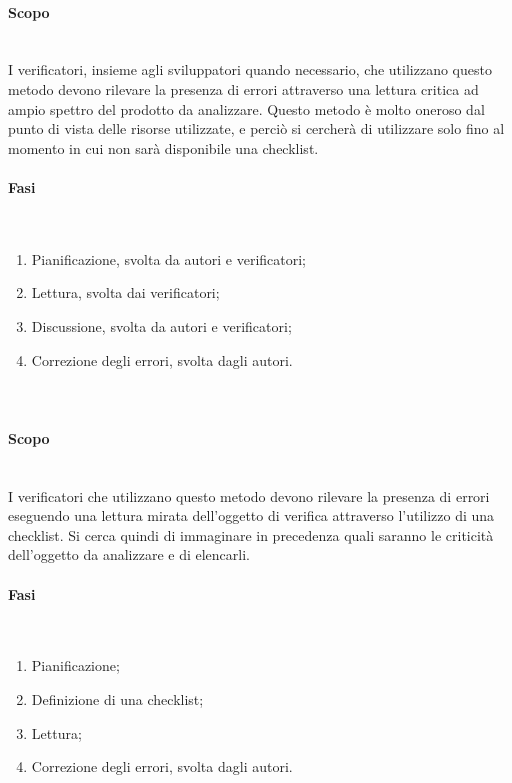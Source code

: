 \paragraph {Scopo}\mbox{}\\
I verificatori, insieme agli sviluppatori quando necessario, che utilizzano questo metodo devono rilevare la presenza di errori attraverso una lettura critica ad ampio spettro del prodotto da analizzare. Questo metodo è molto oneroso dal punto di vista delle risorse utilizzate, e perciò si cercherà di utilizzare solo fino al momento in cui non sarà disponibile una checklist.
\paragraph {Fasi}\mbox{}\\
\begin{enumerate}
	\item Pianificazione, svolta da autori e verificatori;
	\item Lettura, svolta dai verificatori;
	\item Discussione, svolta da autori e verificatori;
	\item Correzione degli errori, svolta dagli autori.
\end{enumerate}
\paragraph {}\mbox{}\\
\paragraph {Scopo}\mbox{}\\
I verificatori che utilizzano questo metodo devono rilevare la presenza di errori eseguendo una lettura mirata dell’oggetto di verifica attraverso l'utilizzo di una checklist. Si cerca quindi di immaginare in precedenza quali saranno le criticità dell'oggetto da analizzare e di elencarli.
\paragraph {Fasi}\mbox{}\\
\begin{enumerate}
	\item Pianificazione;
	\item Definizione di una checklist;
	\item Lettura;
	\item Correzione degli errori, svolta dagli autori.
\end{enumerate}

